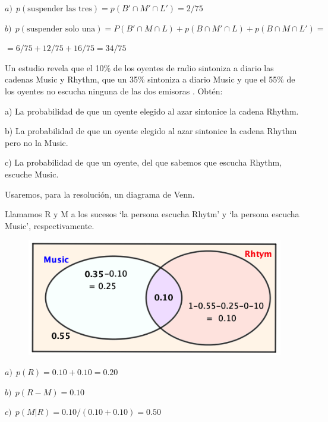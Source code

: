 $a)\ \ p(\text{suspender las tres})=p(B'\cap M'\cap L')=2/75$

$b)\ \ p(\text{suspender solo una})=P(B'\cap M\cap L)+p(B\cap M'\cap L)+p(B\cap M \cap L')=$

$=6/75+12/75+16/75=34/75$


\vspace{5mm}
\begin{ejemplo}
\begin{ejer}
Un estudio revela que el 10\% de los oyentes de radio sintoniza a diario las cadenas Music y Rhythm, que un 35\% sintoniza a diario Music y que el 55\% de los oyentes no escucha ninguna de las dos emisoras . Obtén:

a) La probabilidad de que un oyente elegido al azar sintonice la cadena Rhythm.

b) La probabilidad de que un oyente elegido al azar sintonice la cadena Rhythm pero no la Music.

c) La probabilidad de que un oyente, del que sabemos que escucha Rhythm, escuche Music.	
\end{ejer}
\end{ejemplo}
Usaremos, para la resolución, un diagrama de Venn.

Llamamos R y M a los sucesos `la persona escucha Rhytm' y `la persona escucha Music', respectivamente.

	\begin{figure}[H]
		\centering
		\includegraphics[width=.6\textwidth]{imagenes/imagenes02/T02IM37.png}
	\end{figure}
\vspace{-4mm} %
	
$a)\ \ p(R)=0.10+0.10=0.20$

$b)\ \ p(R-M)=0.10$

$c)\ \ p(M|R)=0.10/(0.10+0.10)=0.50$	
	
